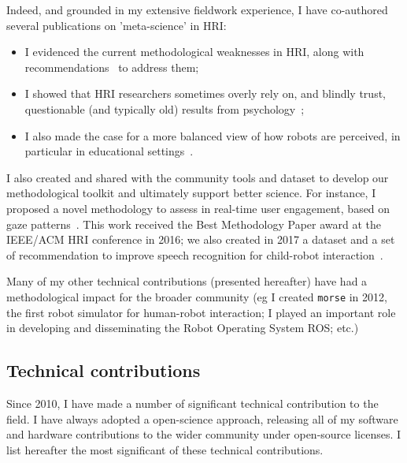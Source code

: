 Indeed, and grounded in my extensive fieldwork experience, I have co-authored
several publications on 'meta-science' in HRI:

\begin{itemize}
    \item I evidenced the current methodological weaknesses in HRI, along with
        recommendations~\autocite{baxter2016characterising} to address them;

    \item I showed that HRI researchers sometimes overly rely on, and blindly
        trust, questionable (and typically old) results from
        psychology~\autocite{irfan2018social};

    \item I also made the case for a more balanced view of how robots are
        perceived, in particular in educational
        settings~\autocite{kennedy2016cautious}.

\end{itemize}

I also created and shared with the community tools and dataset to develop our
methodological toolkit and ultimately support better science. For instance, I
proposed a novel methodology to assess in real-time user engagement, based on
gaze patterns~\autocite{lemaignan2016realtime}. This work received the
Best Methodology Paper award at the IEEE/ACM HRI conference in 2016; we also
created in 2017 a dataset and a set of recommendation to improve speech
recognition for child-robot interaction~\autocite{kennedy2017child}.

Many of my other technical contributions (presented hereafter) have had a
methodological impact for the broader community (eg I created \texttt{morse} in
2012, the first robot simulator for human-robot interaction; I played an
important role in developing and disseminating the Robot Operating System ROS;
etc.)

\subsection{Technical contributions}

Since 2010, I have made a number of significant technical contribution to the
field. I have always adopted a open-science approach, releasing all of my
software and hardware contributions to the wider community under open-source
licenses.  I list hereafter the most significant of these technical
contributions.


